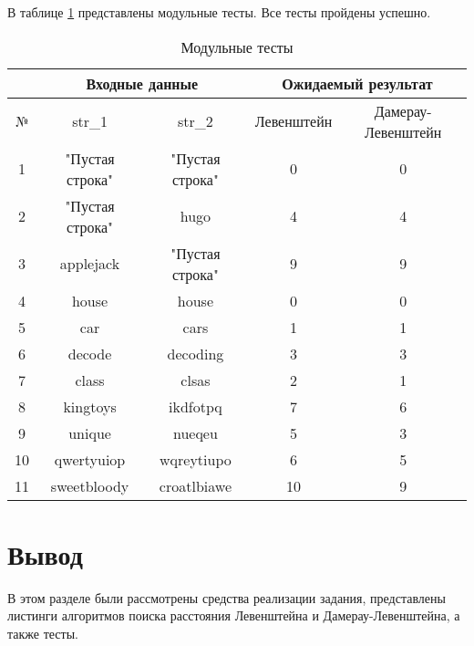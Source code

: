 В таблице \ref{tbl:tests} представлены модульные тесты. Все тесты пройдены успешно.

\begin{table}[h]
	\begin{center}
        \begin{threeparttable}
        \captionsetup{justification=raggedright,singlelinecheck=off}
		\caption{\label{tbl:tests} Модульные тесты}
		\begin{tabular}{|c|c|c|c|c|}
			\hline
			&\multicolumn{2}{c|}{Входные данные}& \multicolumn{2}{c|}{Ожидаемый результат} \\
			\hline
			№&str\_1&str\_2&Левенштейн&Дамерау-Левенштейн \\
			\hline
            1&"Пустая строка"&"Пустая строка"&0&0 \\
            \hline
            2&"Пустая строка"&hugo&4&4 \\
            \hline
            3&applejack&"Пустая строка"&9&9 \\
            \hline
            4&house&house&0&0 \\
			\hline
			5&car&cars&1&1 \\
			\hline
            6&decode&decoding&3&3 \\
			\hline
			7&class&clsas&2&1 \\
			\hline
            8&kingtoys&ikdfotpq&7&6 \\
			\hline
            9&unique&nueqeu&5&3 \\
			\hline
            10&qwertyuiop&wqreytiupo&6&5 \\
			\hline
			11&sweetbloody&croatlbiawe&10&9 \\
			\hline
		\end{tabular}
        \end{threeparttable}
	\end{center}
\end{table}

\section*{Вывод}

В этом разделе были рассмотрены средства реализации задания, представлены листинги алгоритмов поиска расстояния Левенштейна и Дамерау-Левенштейна, а также тесты.




